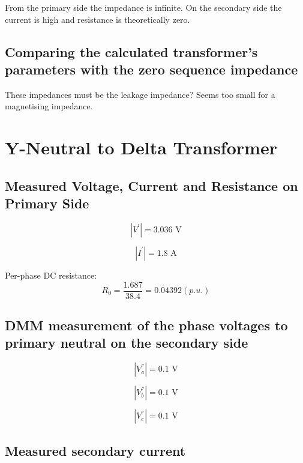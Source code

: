 \documentclass{article}
\begin{document}
From the primary side the impedance is infinite. On the secondary side the current is high and resistance is theoretically zero.

\subsection{Comparing the calculated transformer's parameters with the zero sequence impedance} 
These impedances must be the leakage impedance? Seems too small for a magnetising impedance.

\section{Y-Neutral to Delta Transformer} 

\subsection{Measured Voltage, Current and Resistance on Primary Side} 

\begin{equation}
  | V ^{'} | = 3.036 \text{ V}
\end{equation}

\begin{equation}
  | I ^{'} | = 1.8 \text{ A}
\end{equation}

Per-phase DC resistance:
\begin{equation}
  R_0 = \frac{1.687}{38.4} = 0.04392 (p.u.)
\end{equation}

\subsection{DMM measurement of the phase voltages to primary neutral on the secondary side} 

\begin{equation}
  | V ^{''} _{a} | = 0.1 \text{ V}
\end{equation}

\begin{equation}
  | V ^{''} _{b} | = 0.1 \text{ V}
\end{equation}

\begin{equation}
  | V ^{''} _{c} | = 0.1 \text{ V}
\end{equation}

\subsection{Measured secondary current} 
\end{document}
